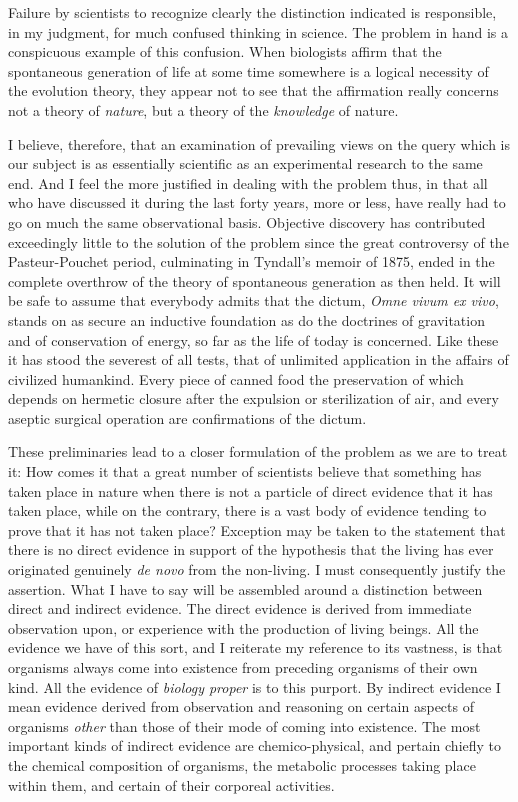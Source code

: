 \documentclass[a4paper, 11pt, oneside, polutonikogreek, english, landscape]{article}
\begin{document}
Failure by scientists to recognize clearly the distinction indicated is responsible, in my judgment, for much confused thinking in science. The problem in hand is a conspicuous example of this confusion. When biologists affirm that the spontaneous generation of life at some time somewhere is a logical necessity of the evolution theory, they appear not to see that the affirmation really concerns not a theory of \emph{nature}, but a theory of the \emph{knowledge} of nature.

I believe, therefore, that an examination of prevailing views on the query which is our subject is as essentially scientific as an experimental research to the same end. And I feel the more justified in dealing with the problem thus, in that all who have discussed it during the last forty years, more or less, have really had to go on much the same observational basis. Objective discovery has contributed exceedingly little to the solution of the problem since the great controversy of the Pasteur-Pouchet period, culminating in Tyndall's memoir of 1875, ended in the complete overthrow of the theory of spontaneous generation as then held. It will be safe to assume that everybody admits that the dictum, \emph{Omne vivum ex vivo}, stands on as secure an inductive foundation as do the doctrines of gravitation and of conservation of energy, so far as the life of today is concerned. Like these it has stood the severest of all tests, that of unlimited application in the affairs of civilized humankind. Every piece of canned food the preservation of which depends on hermetic closure after the expulsion or sterilization of air, and every aseptic surgical operation are confirmations of the dictum.

These preliminaries lead to a closer formulation of the problem as we are to treat it: How comes it that a great number of scientists believe that something has taken place in nature when there is not a particle of direct evidence that it has taken place, while on the contrary, there is a vast body of evidence tending to prove that it has not taken place? Exception may be taken to the statement that there is no direct evidence in support of the hypothesis that the living has ever originated genuinely \emph{de novo} from the non-living. I must consequently justify the assertion. What I have to say will be assembled around a distinction between direct and indirect evidence. The direct evidence is derived from immediate observation upon, or experience with the production of living beings. All the evidence we have of this sort, and I reiterate my reference to its vastness, is that organisms always come into existence from preceding organisms of their own kind. All the evidence of \emph{biology proper} is to this purport. By indirect evidence I mean evidence derived from observation and reasoning on certain aspects of organisms \emph{other} than those of their mode of coming into existence. The most important kinds of indirect evidence are chemico-physical, and pertain chiefly to the chemical composition of organisms, the metabolic processes taking place within them, and certain of their corporeal activities.
\end{document}
